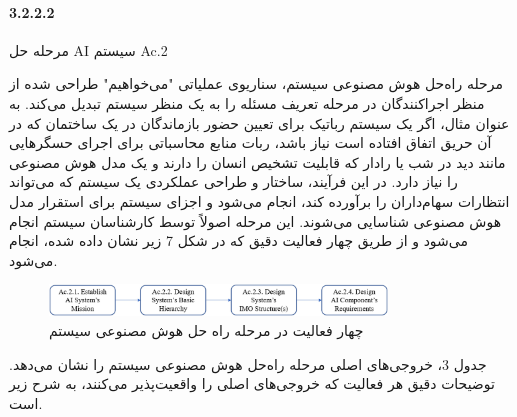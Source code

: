 \documentclass[a4paper,10pt]{article}
\begin{document}
                \paragraph{3.2.2.2}{مرحله حل AI سیستم Ac.2}

                    مرحله راه‌حل هوش مصنوعی سیستم، سناریوی عملیاتی "می‌خواهیم" طراحی شده از منظر اجراکنندگان در مرحله تعریف مسئله را به یک منظر سیستم تبدیل می‌کند. به عنوان مثال، اگر یک سیستم رباتیک برای تعیین حضور بازماندگان در یک ساختمان که در آن حریق اتفاق افتاده است نیاز باشد، ربات منابع محاسباتی برای اجرای حسگرهایی مانند دید در شب یا رادار که قابلیت تشخیص انسان را دارند و یک مدل هوش مصنوعی را نیاز دارد. در این فرآیند، ساختار و طراحی عملکردی یک سیستم که می‌تواند انتظارات سهام‌داران را برآورده کند، انجام می‌شود و اجزای سیستم برای استقرار مدل هوش مصنوعی شناسایی می‌شوند. این مرحله اصولاً توسط کارشناسان سیستم انجام می‌شود و از طریق چهار فعالیت دقیق که در شکل 7 زیر نشان داده شده، انجام می‌شود.

                    \begin{figure}[htbp]

                        \centering
                        \includegraphics[width=0.8\textwidth]{image/fig 7.png}
                        \caption{چهار فعالیت در مرحله راه حل هوش مصنوعی سیستم}
                        \label{fig:fig_7}
                    
                    \end{figure}

                    جدول 3، خروجی‌های اصلی مرحله راه‌حل هوش مصنوعی سیستم را نشان می‌دهد. توضیحات دقیق هر فعالیت که خروجی‌های اصلی را واقعیت‌پذیر می‌کنند، به شرح زیر است.
\end{document}
